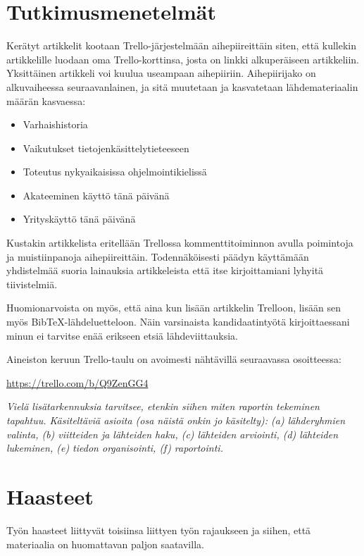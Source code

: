 \documentclass[12pt,a4paper,finnish,oneside]{article}
\begin{document}
\section{Tutkimusmenetelmät}

Kerätyt artikkelit kootaan Trello-järjestelmään aihepiireittäin siten, että kullekin artikkelille luodaan oma Trello-korttinsa, josta on linkki alkuperäiseen artikkeliin. Yksittäinen artikkeli voi kuulua useampaan aihepiiriin. Aihepiirijako on alkuvaiheessa seuraavanlainen, ja sitä muutetaan ja kasvatetaan lähdemateriaalin määrän kasvaessa:

\begin{itemize}
  \item Varhaishistoria
  \item Vaikutukset tietojenkäsittelytieteeseen
  \item Toteutus nykyaikaisissa ohjelmointikielissä
  \item Akateeminen käyttö tänä päivänä
  \item Yrityskäyttö tänä päivänä
\end{itemize}

Kustakin artikkelista eritellään Trellossa kommenttitoiminnon avulla poimintoja ja muistiinpanoja aihepiireittäin. Todennäköisesti päädyn käyttämään yhdistelmää suoria lainauksia artikkeleista että itse kirjoittamiani lyhyitä tiivistelmiä.

Huomionarvoista on myös, että aina kun lisään artikkelin Trelloon, lisään sen myös BibTeX-lähdeluetteloon. Näin varsinaista kandidaatintyötä kirjoittaessani minun ei tarvitse enää erikseen etsiä lähdeviittauksia.

Aineiston keruun Trello-taulu on avoimesti nähtävillä seuraavassa osoitteessa:

\url{https://trello.com/b/Q9ZenGG4}

\emph{Vielä lisätarkennuksia tarvitsee, etenkin siihen miten raportin tekeminen tapahtuu. Käsiteltäviä asioita (osa näistä onkin jo käsitelty):
(a) lähderyhmien valinta,
(b) viitteiden ja lähteiden haku,
(c) lähteiden arviointi,
(d) lähteiden lukeminen,
(e) tiedon organisointi,
(f) raportointi. }

\section{Haasteet}

Työn haasteet liittyvät toisiinsa liittyen työn rajaukseen ja siihen, että materiaalia on huomattavan paljon saatavilla.
\end{document}
